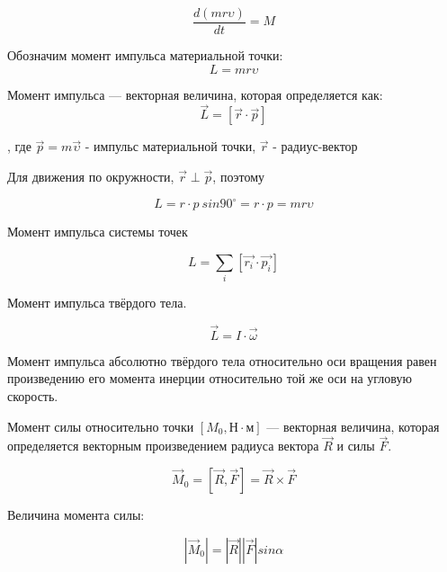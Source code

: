 $$\frac{d(mr\upsilon)}{dt}=M$$

\begin{definition}
    Обозначим момент импульса материальной точки:
    $$L=mr\upsilon$$
\end{definition}

\begin{definition}
    Момент импульса — векторная величина, которая определяется как:
    $$\vec L=[\vec r\cdot\vec p]$$
\end{definition}

, где $\vec p=m\vec\upsilon$ - импульс материальной точки,
$\vec r$ - радиус-вектор

Для движения по окружности, $\vec r\perp\vec p$, поэтому

$$L=r\cdot p\ sin90^\circ=r\cdot p=mr\upsilon$$

Момент импульса системы точек 

$$L=\sum\limits_i [\vec{r_i}\cdot\vec{p_i}]$$

Момент импульса твёрдого тела.

$$\vec L=I\cdot\vec\omega$$

Момент импульса абсолютно твёрдого тела относительно оси вращения равен произведению его момента инерции относительно той же оси 
на угловую скорость.

\begin{definition}
    Момент силы относительно точки $[M_0, Н\cdot м]$ — векторная величина, 
    которая определяется векторным произведением радиуса вектора $\vec R$ и силы $\vec F$.
\end{definition}

$$\vec M_0=[\vec R,\vec F]=\vec R\times\vec F$$

Величина момента силы:

$$|\vec M_0|=|\vec R||\vec F|sin\alpha$$

